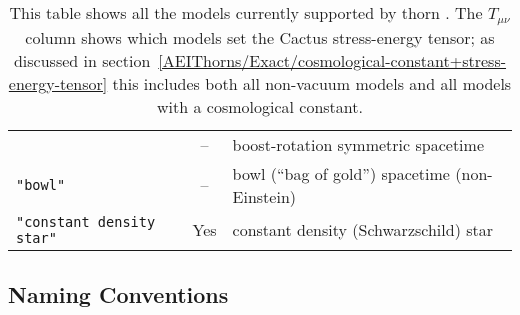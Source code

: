 \begin{table}[htbp]
\begin{center}
\begin{tabular}{@{\qquad}lcp{80mm}}
	& --	& boost-rotation symmetric spacetime			\\
{\tt "bowl"}
	& --	& bowl (``bag of gold'') spacetime (non-Einstein)	\\
{\tt "constant density star"}
	& Yes	& constant density (Schwarzschild) star			%
\end{tabular}
\end{center}
\caption{
	This table shows all the models currently supported by
	thorn .  The $T_{\mu\nu}$ column shows which
	models set the Cactus stress-energy tensor; as discussed in
	section~\ref{AEIThorns/Exact/cosmological-constant+stress-energy-tensor}
	this includes both all non-vacuum models and all models
	with a cosmological constant.
	}
\label{AEIThorns/Exact/tab-all-models}
\end{table}

\subsection{Naming Conventions}

